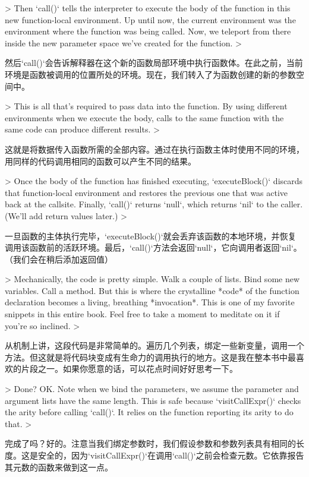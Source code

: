\documentclass[cn,11pt,chinese]{elegantbook}
\begin{document}
{{{{{{{{> Then `call()` tells the interpreter to execute the body of the function in this new function-local environment. Up until now, the current environment was the environment where the function was being called. Now, we teleport from there inside the new parameter space we’ve created for the function.
>

然后`call()`会告诉解释器在这个新的函数局部环境中执行函数体。在此之前，当前环境是函数被调用的位置所处的环境。现在，我们转入了为函数创建的新的参数空间中。

> This is all that’s required to pass data into the function. By using different environments when we execute the body, calls to the same function with the same code can produce different results.
>

这就是将数据传入函数所需的全部内容。通过在执行函数主体时使用不同的环境，用同样的代码调用相同的函数可以产生不同的结果。

> Once the body of the function has finished executing, `executeBlock()` discards that function-local environment and restores the previous one that was active back at the callsite. Finally, `call()` returns `null`, which returns `nil` to the caller. (We’ll add return values later.)
>

一旦函数的主体执行完毕，`executeBlock()`就会丢弃该函数的本地环境，并恢复调用该函数前的活跃环境。最后，`call()`方法会返回`null`，它向调用者返回`nil`。（我们会在稍后添加返回值）

> Mechanically, the code is pretty simple. Walk a couple of lists. Bind some new variables. Call a method. But this is where the crystalline *code* of the function declaration becomes a living, breathing *invocation*. This is one of my favorite snippets in this entire book. Feel free to take a moment to meditate on it if you’re so inclined.
>

从机制上讲，这段代码是非常简单的。遍历几个列表，绑定一些新变量，调用一个方法。但这就是将代码块变成有生命力的调用执行的地方。这是我在整本书中最喜欢的片段之一。如果你愿意的话，可以花点时间好好思考一下。

> Done? OK. Note when we bind the parameters, we assume the parameter and argument lists have the same length. This is safe because `visitCallExpr()` checks the arity before calling `call()`. It relies on the function reporting its arity to do that.
>

完成了吗？好的。注意当我们绑定参数时，我们假设参数和参数列表具有相同的长度。这是安全的，因为`visitCallExpr()`在调用`call()`之前会检查元数。它依靠报告其元数的函数来做到这一点。

}}}}}}}}
\end{document}
